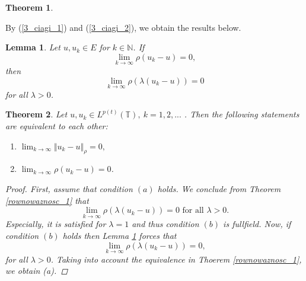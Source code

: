 \documentclass[12pt,a4paper,oneside,titlepage]{article}
\newtheorem{Twierdzenie}{Theorem}
\newtheorem{Lemat}{Lemma}
\begin{document}
\begin{Twierdzenie}
\end{Twierdzenie}



By (\ref{3_ciagi_1}) and (\ref{3_ciagi_2}), we obtain the results below.
\begin{Lemat}
\label{3_ciagi}
Let $u, u_k \in E$ for $k \in \mathbb{N}$. If 
\begin{equation}
\nonumber
\lim_{k \rightarrow \infty} \rho(u_k - u)=0,
\end{equation} then 
\begin{equation}
\nonumber
\lim_{k \rightarrow \infty} \rho( \lambda  ( u_k - u))=0 
\end{equation}
for all $\lambda >0$.
\end{Lemat}










\begin{Twierdzenie}
\label{warunki}
Let $u, u_k \in L^{p(t)}(\mathbb{T}),~ k =1,2,...$ . Then the following statements are equivalent to each other:
\begin{enumerate}
\item[(a)] $ \lim_{k \rightarrow \infty} \Vert u_k - u \Vert_{\rho}=0,$
\item[(b)] $ \lim_{k \rightarrow \infty} \rho(u_k - u)=0 $.
\end{enumerate}
\begin{proof}
First, assume that condition $(a)$ holds. We conclude from Theorem \ref{rownowaznosc_1} that
\begin{equation}
\nonumber
\lim_{k \rightarrow \infty} \rho(\lambda (u_k - u))=0 \text{ for all } \lambda>0.
\end{equation}
Especially, it is satisfied for $\lambda =1$ and thus condition $(b)$ is fullfield. 
Now, if condition $(b)$ holds then Lemma \ref{3_ciagi} forces that 
\begin{equation}
\nonumber
\lim_{k \rightarrow \infty} \rho( \lambda  ( u_k - u))=0,
\end{equation}
 for all $\lambda >0$. Taking into account the equivalence in Thoerem \ref{rownowaznosc_1}, we obtain (a).
\end{proof}
\end{Twierdzenie}
\end{document}

